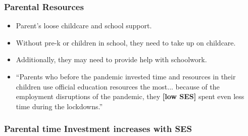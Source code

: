\documentclass{beamer}
\begin{document}
\begin{frame}
    \label{frame:parentaldilution_intro}
    \frametitle{Parental Resources}
       \begin{itemize}
           \item Parent's loose childcare and school support.
           \item Without pre-k or children in school, they need to take up on childcare.
           \item Additionally, they may need to provide help with schoolwork.
           \item ``Parents who before the pandemic invested time and resources in their children use official education resources the most... because of the employment  disruptions of the pandemic, they \textbf{[low SES]} spent  even less time during the lockdowns.'' \cite{naslund-hadley_education_2021}
       \end{itemize}
\end{frame}

\begin{frame}
    \label{frame:parental_investments_vs_ses}
    \frametitle{Parental time Investment increases with SES}
        {
    }

\end{frame}
\end{document}
